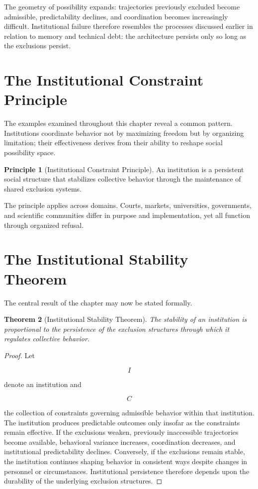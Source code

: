 \documentclass[11pt,oneside]{book}
\theoremstyle{plain}
\newtheorem{theorem}{Theorem}[chapter]
\theoremstyle{definition}
\newtheorem{principle}[theorem]{Principle}
\theoremstyle{remark}
\begin{document}
The geometry of possibility expands: trajectories previously excluded become admissible, predictability declines, and coordination becomes increasingly difficult. Institutional failure therefore resembles the processes discussed earlier in relation to memory and technical debt: the architecture persists only so long as the exclusions persist.

\section{The Institutional Constraint Principle}

The examples examined throughout this chapter reveal a common pattern. Institutions coordinate behavior not by maximizing freedom but by organizing limitation; their effectiveness derives from their ability to reshape social possibility space.

\begin{principle}[Institutional Constraint Principle]
An institution is a persistent social structure that stabilizes collective behavior through the maintenance of shared exclusion systems.
\end{principle}

The principle applies across domains. Courts, markets, universities, governments, and scientific communities differ in purpose and implementation, yet all function through organized refusal.

\section{The Institutional Stability Theorem}

The central result of the chapter may now be stated formally.

\begin{theorem}[Institutional Stability Theorem]
The stability of an institution is proportional to the persistence of the exclusion structures through which it regulates collective behavior.
\end{theorem}

\begin{proof}
Let

\begin{equation}
I
\end{equation}

denote an institution and

\begin{equation}
C
\end{equation}

the collection of constraints governing admissible behavior within that institution. The institution produces predictable outcomes only insofar as the constraints remain effective. If the exclusions weaken, previously inaccessible trajectories become available, behavioral variance increases, coordination decreases, and institutional predictability declines. Conversely, if the exclusions remain stable, the institution continues shaping behavior in consistent ways despite changes in personnel or circumstances. Institutional persistence therefore depends upon the durability of the underlying exclusion structures.
\end{proof}
\end{document}

